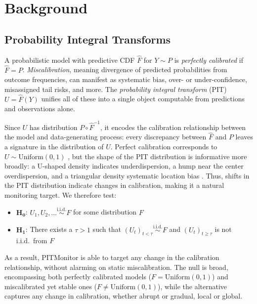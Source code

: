 \documentclass[ejsv2, noshowframe]{imsart}
\theoremstyle{plain}
\theoremstyle{definition}
\theoremstyle{remark}
\newcommand{\Unif}{\mathrm{Uniform}}
\begin{document}
\section{Background}

\subsection{Probability Integral Transforms}
\label{pits}
A probabilistic model with predictive CDF $\hat{F}$ for $Y \sim P$ is \emph{perfectly calibrated} if $\hat{F} = P$. \emph{Miscalibration}, meaning divergence of predicted probabilities from outcome frequencies, can manifest as systematic bias, over- or under-confidence, misassigned tail risks, and more. The \emph{probability integral transform} (PIT) $U = \hat{F}(Y)$ unifies all of these into a single object computable from predictions and observations alone.

Since $U$ has distribution $P \circ \hat{F}^{-1}$, it encodes the calibration relationship between the model and data-generating process: every discrepancy between $\hat{F}$ and $P$ leaves a signature in the distribution of $U$. Perfect calibration corresponds to $U \sim \Unif(0,1)$ \citep{dawid1984statistical}, but the shape of the PIT distribution is informative more broadly: a U-shaped density indicates underdispersion, a hump near the center overdispersion, and a triangular density systematic location bias \citep{gneiting2007probabilistic}. Thus, shifts in the PIT distribution indicate changes in calibration, making it a natural monitoring target. We therefore test:
\begin{itemize}
 \item $\mathbf{H_0}$: $U_1, U_2, \ldots \overset{\mathrm{i.i.d.}}{\sim} F$ for some distribution $F$
 \item $\mathbf{H_1}$: There exists a $\tau > 1$ such that $(U_t)_{t < \tau} \overset{\mathrm{i.i.d.}}{\sim} F$ and $(U_t)_{t \ge \tau}$ is not i.i.d.\ from $F$
\end{itemize}
As a result, PITMonitor is able to target any change in the calibration relationship, without alarming on static miscalibration. The null is broad, encompassing both perfectly calibrated models ($F = \Unif(0,1)$) and miscalibrated yet stable ones ($F \neq \Unif(0,1)$), while the alternative captures any change in calibration, whether abrupt or gradual, local or global.
\end{document}
